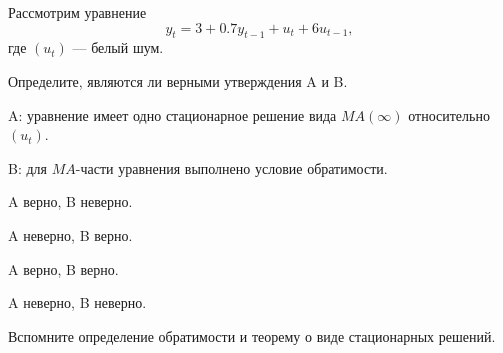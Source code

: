
\begin{question}
Рассмотрим уравнение
\[
y_t = 3 + 0.7 y_{t-1} + u_t + 6 u_{t-1},
\]
где \((u_t)\) --- белый шум.

Определите, являются ли верными утверждения A и B.

A: уравнение имеет одно стационарное решение вида \(MA(\infty)\) относительно \((u_t)\).

B: для \(MA\)-части уравнения выполнено условие обратимости.
\begin{answerlist}
  \item A верно, B неверно.
  \item A неверно, B верно.
  \item A верно, B верно.
  \item A неверно, B неверно.
\end{answerlist}
\end{question}

\begin{solution}
Вспомните определение обратимости и теорему о виде стационарных решений.
\end{solution}

